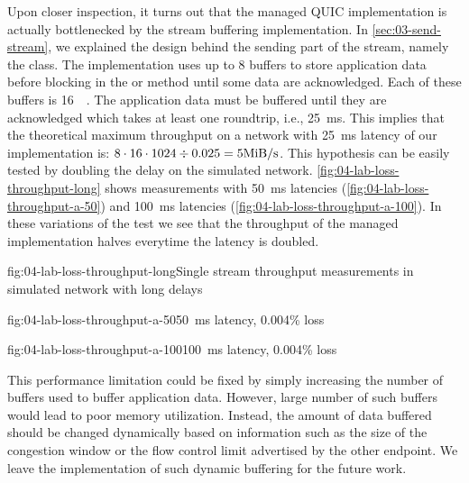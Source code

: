 Upon closer inspection, it turns out that the managed QUIC implementation is actually bottlenecked
by the stream buffering implementation. In \autoref{sec:03-send-stream}, we explained the design
behind the sending part of the stream, namely the \SendStream{} class. The implementation uses up to
8 buffers to store application data before blocking in the  or 
method until some data are acknowledged. Each of these buffers is \SI{16}{\kibi\byte}. The
application data must be buffered until they are acknowledged which takes at least one roundtrip,
i.e., \SI{25}{\milli\second}. This implies that the theoretical maximum throughput on a network with
\SI{25}{\milli\second} latency of our implementation is:
$8 \cdot 16 \cdot 1024 \div 0.025 = 5 \si[per-mode=symbol]{\mebi\byte\per\second} $. This hypothesis can be
easily tested by doubling the delay on the simulated network.
\autoref{fig:04-lab-loss-throughput-long} shows measurements with \SI{50}{\milli\second} latencies
(\autoref{fig:04-lab-loss-throughput-a-50}) and \SI{100}{\milli\second} latencies
(\autoref{fig:04-lab-loss-throughput-a-100}). In these variations of the test we see that the
throughput of the managed implementation halves everytime the latency is doubled.

\begin{myFigure}{fig:04-lab-loss-throughput-long}{Single stream throughput measurements in simulated network with long delays}
\begin{mySubfigure}{0.49\linewidth}{fig:04-lab-loss-throughput-a-50}{\SI{50}{\milli\second} latency, 0.004\% loss}
\footnotesize

\end{mySubfigure}
\begin{mySubfigure}{0.49\linewidth}{fig:04-lab-loss-throughput-a-100}{\SI{100}{\milli\second} latency, 0.004\% loss}
\footnotesize

\end{mySubfigure}
\end{myFigure}

This performance limitation could be fixed by simply increasing the number of buffers used to buffer
application data. However, large number of such buffers would lead to poor memory utilization.
Instead, the amount of data buffered should be changed dynamically based on information such as the
size of the congestion window or the flow control limit advertised by the other endpoint. We leave
the implementation of such dynamic buffering for the future work.

